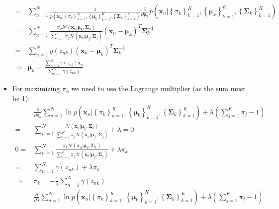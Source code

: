 \begin{itemize}
\begin{equation*}
\begin{split}
			= & \sum\limits_{n=1}^{N} \frac{1}{ p\left(\bm{x}_n|\left\{\pi_k\right\}_{k=1}^{K}, \left\{\bm{\mu}_k\right\}_{k=1}^{K}, \left\{\bm{\Sigma}_k\right\}_{k=1}^{K}\right)} \frac{\partial}{\partial \bm{\mu}_k} p\left(\bm{x}_n|\left\{\pi_k\right\}_{k=1}^{K}, \left\{\bm{\mu}_k\right\}_{k=1}^{K}, \left\{\bm{\Sigma}_k\right\}_{k=1}^{K}\right)\\
			= & \sum\limits_{n=1}^{N} \frac{\pi_k \mathcal{N}\left(\bm{x}_n|\bm{\mu}_k, \bm{\Sigma}_k\right)}{\sum\limits_{j=1}^{K}\pi_j \mathcal{N}\left(\bm{x}_n|\bm{\mu}_j, \bm{\Sigma}_j\right)} \left(\bm{x}_n - \bm{\mu}_k\right)^T\bm{\Sigma}_k^{-1}\\
			= & \sum\limits_{n=1}^{N} y\left(z_{nk}\right) \left(\bm{x}_n - \bm{\mu}_k\right)^T\bm{\Sigma}_k^{-1}\\
			\Rightarrow & \bm{\mu}_k = \frac{\sum_{n=1}^{N}\gamma\left(z_{nk}\right)\bm{x}_n}{\sum_{n=1}^{N}\gamma\left(z_{nk}\right)}
		\end{split}
	\end{equation*}
	\item For maximizing $\pi_k$ we need to use the Lagrange multiplier (as the sum must be 1):
	\begin{equation*}
		\begin{split}
			& \frac{\partial}{\partial \pi_k} \sum\limits_{n=1}^{N} \ln p\left(\bm{x}_n|\left\{\pi_k\right\}_{k=1}^{K}, \left\{\bm{\mu}_k\right\}_{k=1}^{K}, \left\{\bm{\Sigma}_k\right\}_{k=1}^{K}\right) + \lambda \left(\sum\limits_{j=1}^{K}\pi_j - 1\right)\\
			= & \sum\limits_{n=1}^{N} \frac{ \mathcal{N}\left(\bm{x}_n|\bm{\mu}_k, \bm{\Sigma}_k\right)}{\sum\limits_{j=1}^{K}\pi_j \mathcal{N}\left(\bm{x}_n|\bm{\mu}_j, \bm{\Sigma}_j\right)} + \lambda = 0\\
			0 = & \sum\limits_{n=1}^{N} \frac{\pi_k \mathcal{N}\left(\bm{x}_n|\bm{\mu}_k, \bm{\Sigma}_k\right)}{\sum\limits_{j=1}^{K}\pi_j \mathcal{N}\left(\bm{x}_n|\bm{\mu}_j, \bm{\Sigma}_j\right)} + \lambda \pi_k\\
			= & \sum\limits_{n=1}^{N} \gamma\left(z_{nk}\right) + \lambda \pi_k\\
			\Rightarrow & \pi_k = -\frac{1}{\lambda}\sum\limits_{n=1}^{N} \gamma\left(z_{nk}\right)\\[10pt]
			& \frac{\partial}{\partial \lambda} \sum\limits_{n=1}^{N} \ln p\left(\bm{x}_n|\left\{\pi_k\right\}_{k=1}^{K}, \left\{\bm{\mu}_k\right\}_{k=1}^{K}, \left\{\bm{\Sigma}_k\right\}_{k=1}^{K}\right) + \lambda \left(\sum\limits_{j=1}^{K}\pi_j - 1\right)\\

\end{split}
\end{equation*}
\end{itemize}
